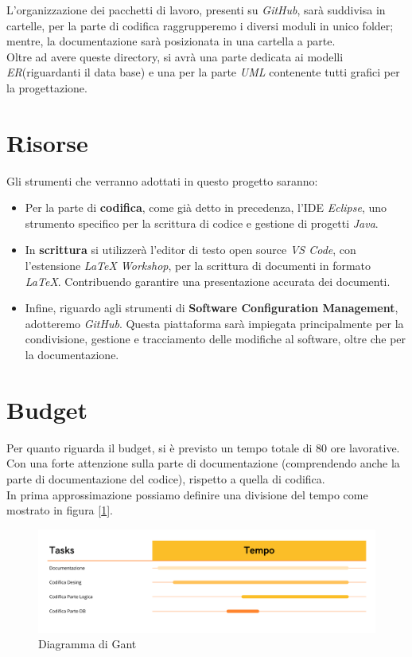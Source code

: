 \documentclass[12pt, letterpaper]{book}
\begin{document}
L'organizzazione dei pacchetti di lavoro, presenti su \textit{GitHub}, sarà suddivisa in cartelle, per la parte di codifica raggrupperemo i diversi moduli in unico folder; mentre, la documentazione sarà posizionata in una cartella a parte.\\

Oltre ad avere queste directory, si avrà una parte dedicata ai modelli \textit{ER}(riguardanti il data base) e una per la parte \textit{UML} contenente tutti grafici per la progettazione.

\section{Risorse}

Gli strumenti che verranno adottati in questo progetto saranno:
\begin{itemize}
    \item Per la parte di \textbf{codifica}, come già detto in precedenza, l'IDE \textit{Eclipse}, uno strumento specifico per la scrittura di codice e gestione di progetti \textit{Java}.
    \item In \textbf{scrittura} si utilizzerà l'editor di testo open source \textit{VS Code}, con l'estensione \textit{LaTeX Workshop}, per la scrittura di documenti in formato \textit{LaTeX}. Contribuendo garantire una presentazione accurata dei documenti.
    \item Infine, riguardo agli strumenti di \textbf{Software Configuration Management}, adotteremo \textit{GitHub}. Questa piattaforma sarà impiegata principalmente per la condivisione, gestione e tracciamento delle modifiche al software, oltre che per la documentazione.

\end{itemize}

\section{Budget}

Per quanto riguarda il budget, si è previsto un tempo totale di 80 ore lavorative. Con una forte attenzione sulla parte di documentazione (comprendendo anche la parte di documentazione del codice), rispetto a quella di codifica.\\

In prima approssimazione possiamo definire una divisione del tempo come mostrato in figura [\ref{fig: diagramma_gant}].
\begin{figure}[h]
    \centering
    \includegraphics[width = 1\linewidth]{Diagramma_Gant.jpg}
    \caption{Diagramma di Gant}
    \label{fig: diagramma_gant}
\end{figure}
\end{document}
